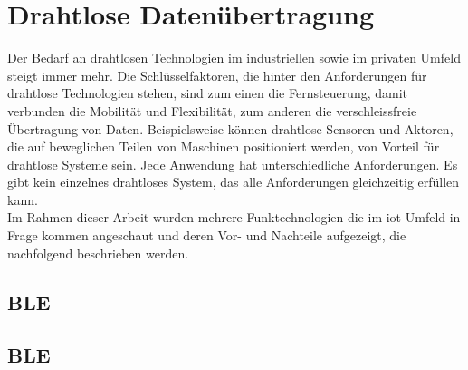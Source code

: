 \chapter{Drahtlose Datenübertragung}

Der Bedarf an drahtlosen Technologien im industriellen sowie im privaten Umfeld steigt immer mehr. Die Schlüsselfaktoren, die hinter den Anforderungen für drahtlose Technologien stehen, sind zum einen die Fernsteuerung, damit verbunden die Mobilität und Flexibilität, zum anderen die verschleissfreie Übertragung von Daten. Beispielsweise können drahtlose Sensoren und Aktoren, die auf beweglichen Teilen von Maschinen positioniert werden, von Vorteil für drahtlose Systeme sein. Jede Anwendung hat unterschiedliche Anforderungen. Es gibt kein einzelnes drahtloses System, das alle Anforderungen gleichzeitig erfüllen kann.\\
Im Rahmen dieser Arbeit wurden mehrere Funktechnologien die im \acrshort{iot}-Umfeld in Frage kommen angeschaut und deren Vor- und Nachteile aufgezeigt, die nachfolgend beschrieben werden.

\section{BLE}

\section{BLE}